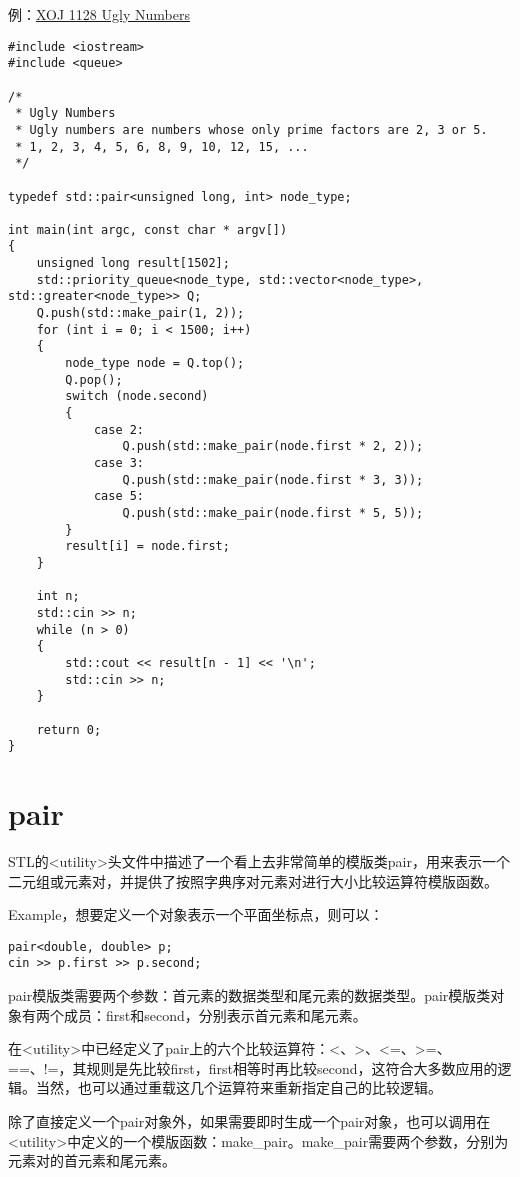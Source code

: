 例：\href{https://xoj.red/problems/show/1128}{XOJ 1128 Ugly Numbers}
\begin{lstlisting}
#include <iostream>
#include <queue>

/*
 * Ugly Numbers
 * Ugly numbers are numbers whose only prime factors are 2, 3 or 5.
 * 1, 2, 3, 4, 5, 6, 8, 9, 10, 12, 15, ...
 */

typedef std::pair<unsigned long, int> node_type;

int main(int argc, const char * argv[])
{
    unsigned long result[1502];
    std::priority_queue<node_type, std::vector<node_type>, std::greater<node_type>> Q;
    Q.push(std::make_pair(1, 2));
    for (int i = 0; i < 1500; i++)
    {
        node_type node = Q.top();
        Q.pop();
        switch (node.second)
        {
            case 2:
                Q.push(std::make_pair(node.first * 2, 2));
            case 3:
                Q.push(std::make_pair(node.first * 3, 3));
            case 5:
                Q.push(std::make_pair(node.first * 5, 5));
        }
        result[i] = node.first;
    }

    int n;
    std::cin >> n;
    while (n > 0)
    {
        std::cout << result[n - 1] << '\n';
        std::cin >> n;
    }

    return 0;
}
\end{lstlisting}


\section{pair}
STL的<utility>头文件中描述了一个看上去非常简单的模版类pair，用来表示一个二元组或元素对，并提供了按照字典序对元素对进行大小比较运算符模版函数。 

Example，想要定义一个对象表示一个平面坐标点，则可以：

\begin{lstlisting}
pair<double, double> p;
cin >> p.first >> p.second;
\end{lstlisting}

pair模版类需要两个参数：首元素的数据类型和尾元素的数据类型。pair模版类对象有两个成员：first和second，分别表示首元素和尾元素。 

在<utility>中已经定义了pair上的六个比较运算符：<、>、<=、>=、==、!=，其规则是先比较first，first相等时再比较second，这符合大多数应用的逻辑。当然，也可以通过重载这几个运算符来重新指定自己的比较逻辑。 

除了直接定义一个pair对象外，如果需要即时生成一个pair对象，也可以调用在<utility>中定义的一个模版函数：make\_pair。make\_pair需要两个参数，分别为元素对的首元素和尾元素。

